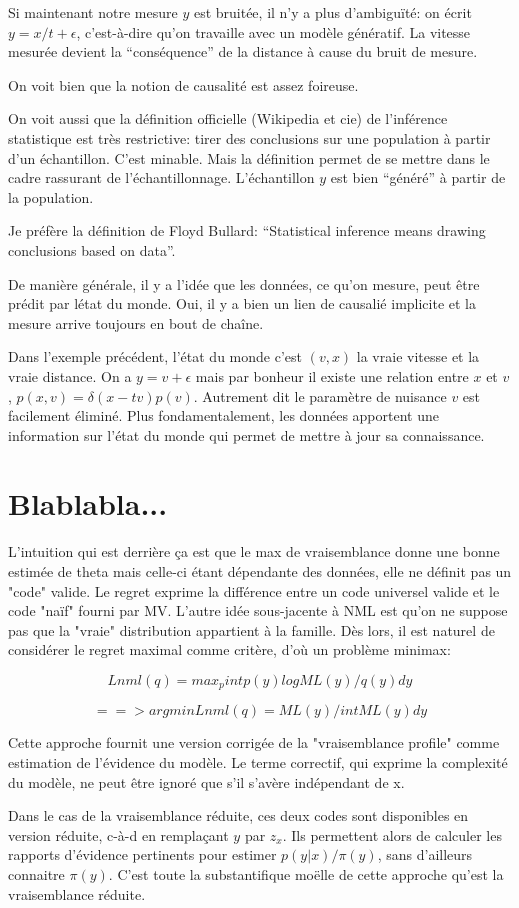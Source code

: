 \documentclass{article}
\begin{document}
Si maintenant notre mesure $y$ est bruit\'ee, il n'y a plus d'ambigu\"it\'e: on \'ecrit $y=x/t+\epsilon$, c'est-\`a-dire qu'on travaille avec un mod\`ele g\'en\'eratif. La vitesse mesur\'ee devient la ``cons\'equence'' de la distance \`a cause du bruit de mesure.

On voit bien que la notion de causalit\'e est assez foireuse.

On voit aussi que la d\'efinition officielle (Wikipedia et cie) de l'inf\'erence statistique est tr\`es restrictive: tirer des conclusions sur une population \`a partir d'un \'echantillon. C'est minable. Mais la d\'efinition permet de se mettre dans le cadre rassurant de l'\'echantillonnage. L'\'echantillon $y$ est bien ``g\'en\'er\'e'' \`a partir de la population.

Je pr\'ef\`ere la d\'efinition de Floyd Bullard: ``Statistical inference means drawing conclusions based on data''.

De mani\`ere g\'en\'erale, il y a l'id\'ee que les donn\'ees, ce qu'on mesure, peut \^etre pr\'edit par l\'etat du monde. Oui, il y a bien un lien de causali\'e implicite et la mesure arrive toujours en bout de cha\^ine.

Dans l'exemple pr\'ec\'edent, l'\'etat du monde c'est $(v,x)$ la vraie vitesse et la vraie distance. On a $y=v+\epsilon$ mais par bonheur il existe une relation entre $x$ et $v$, 
$p(x,v)=\delta(x-tv)p(v)$. Autrement dit le param\`etre de nuisance $v$ est facilement \'elimin\'e. Plus fondamentalement, les donn\'ees apportent une information sur l'\'etat du monde qui permet de mettre \`a jour sa connaissance.


\section{Blablabla...}


L'intuition qui est derri\`ere \c{c}a est que le max de vraisemblance donne une bonne estim\'ee de theta mais celle-ci \'etant d\'ependante des donn\'ees, elle ne d\'efinit pas un "code" valide. Le regret exprime la diff\'erence entre un code universel valide et le code "na\"if" fourni par MV. L'autre id\'ee sous-jacente \`a NML est qu'on ne suppose pas que la "vraie" distribution appartient \`a la famille. D\`es lors, il est naturel de consid\'erer le regret maximal comme crit\`ere, d'o\`u un probl\`eme minimax: 

$$Lnml(q) = max_p int p(y) log ML(y)/q(y) dy$$ 

$$==> argmin Lnml(q) = ML(y) / int ML(y) dy$$ 

Cette approche fournit une version corrig\'ee de la "vraisemblance profile" comme estimation de l'\'evidence du mod\`ele. Le terme correctif, qui exprime la complexit\'e du mod\`ele, ne peut \^etre ignor\'e que s'il s'av\`ere ind\'ependant de x. 

Dans le cas de la vraisemblance r\'eduite, ces deux codes sont disponibles en version r\'eduite, c-\`a-d en rempla\c{c}ant $y$ par $z_x$. Ils permettent alors de calculer les rapports d'\'evidence pertinents pour estimer $p(y|x)/\pi(y)$, sans d'ailleurs connaitre $\pi(y)$. C'est toute la substantifique mo\"elle de cette approche qu'est la vraisemblance r\'eduite. 
\end{document}

